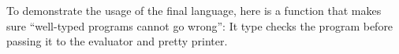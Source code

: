 To demonstrate the usage of the final language, here is a function that makes
sure ``well-typed programs cannot go wrong'':
It type checks the program before passing it to the evaluator and pretty
printer.




